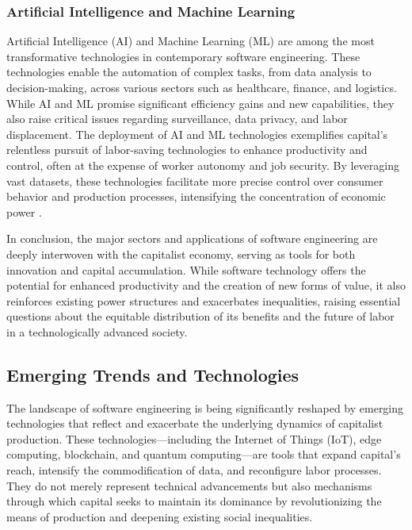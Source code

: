 \begin{refsection}
\subsubsection{Artificial Intelligence and Machine Learning}

Artificial Intelligence (AI) and Machine Learning (ML) are among the most transformative technologies in contemporary software engineering. These technologies enable the automation of complex tasks, from data analysis to decision-making, across various sectors such as healthcare, finance, and logistics. While AI and ML promise significant efficiency gains and new capabilities, they also raise critical issues regarding surveillance, data privacy, and labor displacement. The deployment of AI and ML technologies exemplifies capital's relentless pursuit of labor-saving technologies to enhance productivity and control, often at the expense of worker autonomy and job security. By leveraging vast datasets, these technologies facilitate more precise control over consumer behavior and production processes, intensifying the concentration of economic power \cite[pp.~202-204]{zuboff2020age}.

In conclusion, the major sectors and applications of software engineering are deeply interwoven with the capitalist economy, serving as tools for both innovation and capital accumulation. While software technology offers the potential for enhanced productivity and the creation of new forms of value, it also reinforces existing power structures and exacerbates inequalities, raising essential questions about the equitable distribution of its benefits and the future of labor in a technologically advanced society.

\subsection{Emerging Trends and Technologies}

The landscape of software engineering is being significantly reshaped by emerging technologies that reflect and exacerbate the underlying dynamics of capitalist production. These technologies—including the Internet of Things (IoT), edge computing, blockchain, and quantum computing—are tools that expand capital's reach, intensify the commodification of data, and reconfigure labor processes. They do not merely represent technical advancements but also mechanisms through which capital seeks to maintain its dominance by revolutionizing the means of production and deepening existing social inequalities.


\end{refsection}
